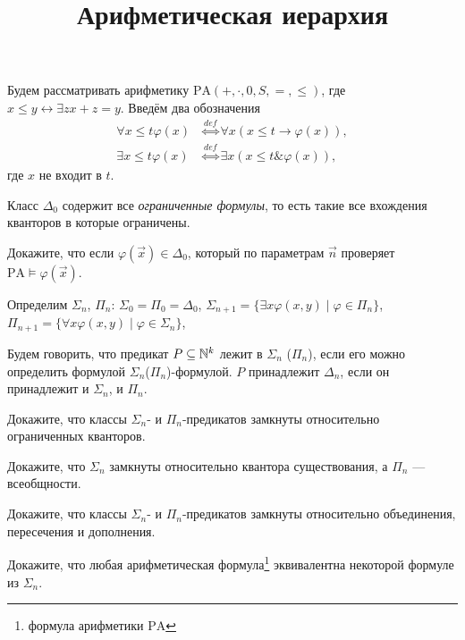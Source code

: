 \documentclass[a4paper, 12pt, num=Г2]{listok}
\renewcommand{\phi}{\varphi}
\begin{document}
\title{Арифметическая иерархия}
\maketitle
Будем рассматривать арифметику $\mathrm{PA}(+, \cdot, 0, S, =, \le)$,
где $x \le y \leftrightarrow \exists z x + z = y$.
Введём два обозначения
\begin{align*}
	\forall{ x \le t }\phi(x) & \stackrel{def}{\Leftrightarrow} \forall x (x \le t \to \phi(x)), \\
	\exists{ x \le t }\phi(x) & \stackrel{def}{\Leftrightarrow} \exists x (x \le t \&  \phi(x)),
\end{align*}
где $x$ не входит в $t$.
\begin{definition}
	Класс $\Delta_0$ содержит все \textit{ограниченные формулы},
	то есть такие все вхождения кванторов в которые ограничены.
\end{definition}
\begin{problem}
	Докажите, что если $\phi(\vec x) \in \Delta_0$,
	который по параметрам $\vec n$ проверяет $\mathrm{PA} \models \phi(\vec x)$.
\end{problem}
\begin{definition}
	Определим $\Sigma_n$, $\Pi_n$:
	$\Sigma_0 = \Pi_0 = \Delta_0$,
	$\Sigma_{n + 1} = \{ \exists x \phi(x, y) \mid \phi \in \Pi_n \}$,
	$\Pi_{n + 1} = \{ \forall x \phi(x, y) \mid \phi \in \Sigma_n \}$,
\end{definition}
\begin{definition}
	Будем говорить, что предикат $P \subseteq \mathbb{N}^k$ лежит в $\Sigma_n$ ($\Pi_n$),
	если его можно определить формулой $\Sigma_n$($\Pi_n$)-формулой.
	$P$ принадлежит $\Delta_n$, если он принадлежит и $\Sigma_n$, и $\Pi_n$.
\end{definition}
\begin{problem}
	Докажите, что классы $\Sigma_n$- и $\Pi_n$-предикатов замкнуты относительно ограниченных кванторов.
\end{problem}
\begin{problem}
	Докажите, что $\Sigma_n$ замкнуты относительно квантора существования, а $\Pi_n$ --- всеобщности.
\end{problem}
\begin{problem}
	Докажите, что классы $\Sigma_n$- и $\Pi_n$-предикатов замкнуты относительно объединения, пересечения и дополнения.
\end{problem}
\begin{problem}
	Докажите, что любая арифметическая формула\footnote{формула арифметики $\mathrm{PA}$} эквивалентна некоторой формуле из $\Sigma_n$.
\end{problem}
\end{document}

